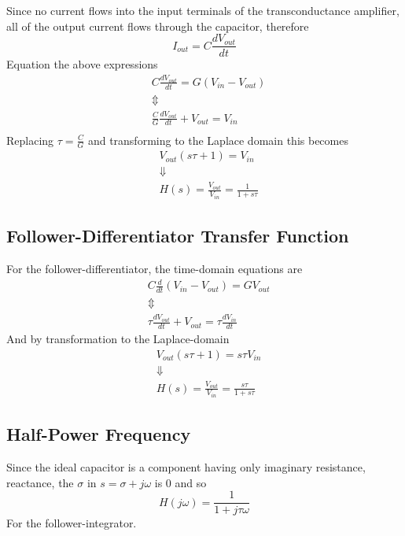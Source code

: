 Since no current flows into the input terminals of the transconductance amplifier, all of the
output current flows through the capacitor, therefore
\begin{equation*}
    I_{out} = C\frac{dV_{out}}{dt}
\end{equation*}
Equation the above expressions
\begin{align*}
    &C\frac{dV_{out}}{dt} = G\left(V_{in} - V_{out}\right) \\
    &                     \Updownarrow \\
    &\frac{C}{G}\frac{dV_{out}}{dt} + V_{out} =  V_{in} \\
\end{align*}
Replacing \(\tau = \frac{C}{G}\) and transforming to the Laplace domain this becomes
\begin{align*}
    &V_{out}\left( s\tau + 1 \right) = V_{in} \\
    &\Downarrow  \\
    &H(s) = \frac{V_{out}}{V_{in}} = \frac{1}{1+s\tau}
\end{align*}

\subsection{Follower-Differentiator Transfer Function}
For the follower-differentiator, the time-domain equations are
\begin{align*}
    &C\frac{d}{dt}\left(V_{in}-V_{out}\right) = GV_{out} \\
    &\Updownarrow \\
    &\tau \frac{dV_{out}}{dt} + V_{out} = \tau \frac{dV_{in}}{dt} 
\end{align*}
And by transformation to the Laplace-domain
\begin{align*}
    &V_{out}\left(s\tau + 1\right) = s\tau V_{in} \\
    &\Downarrow \\
    &H(s) = \frac{V_{out}}{V_{in}} = \frac{s\tau}{1+s\tau}
\end{align*}

\subsection{Half-Power Frequency}
Since the ideal capacitor is a component having only imaginary resistance, reactance, the \(\sigma\) in \(s=\sigma+j\omega\) is \(0\) and so
\begin{equation*}
    H(j\omega) = \frac{1}{1+j\tau \omega}
\end{equation*}
For the follower-integrator.

